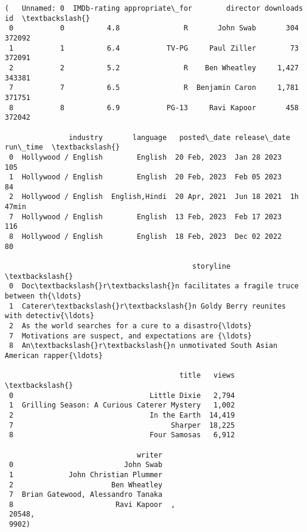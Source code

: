 \documentclass[11pt]{article}
\makeatletter
\newcommand{\boxspacing}{\kern\kvtcb@left@rule\kern\kvtcb@boxsep}
\newcommand{\prompt}[4]{
        {\ttfamily\llap{{\color{#2}[#3]:\hspace{3pt}#4}}\vspace{-\baselineskip}}
    }
\makeatother
\begin{document}
            \begin{tcolorbox}[breakable, size=fbox, boxrule=.5pt, pad at break*=1mm, opacityfill=0]
\prompt{Out}{outcolor}{48}{\boxspacing}
\begin{Verbatim}[commandchars=\\\{\}]
(   Unnamed: 0  IMDb-rating appropriate\_for        director downloads      id  \textbackslash{}
 0           0          4.8               R       John Swab       304  372092
 1           1          6.4           TV-PG     Paul Ziller        73  372091
 2           2          5.2               R    Ben Wheatley     1,427  343381
 7           7          6.5               R  Benjamin Caron     1,781  371751
 8           8          6.9           PG-13     Ravi Kapoor       458  372042

               industry       language   posted\_date release\_date  run\_time  \textbackslash{}
 0  Hollywood / English        English  20 Feb, 2023  Jan 28 2023       105
 1  Hollywood / English        English  20 Feb, 2023  Feb 05 2023        84
 2  Hollywood / English  English,Hindi  20 Apr, 2021  Jun 18 2021  1h 47min
 7  Hollywood / English        English  13 Feb, 2023  Feb 17 2023       116
 8  Hollywood / English        English  18 Feb, 2023  Dec 02 2022        80

                                            storyline  \textbackslash{}
 0  Doc\textbackslash{}r\textbackslash{}n facilitates a fragile truce between th{\ldots}
 1  Caterer\textbackslash{}r\textbackslash{}n Goldy Berry reunites with detectiv{\ldots}
 2  As the world searches for a cure to a disastro{\ldots}
 7  Motivations are suspect, and expectations are {\ldots}
 8  An\textbackslash{}r\textbackslash{}n unmotivated South Asian American rapper{\ldots}

                                         title   views  \textbackslash{}
 0                                Little Dixie   2,794
 1  Grilling Season: A Curious Caterer Mystery   1,002
 2                                In the Earth  14,419
 7                                     Sharper  18,225
 8                                Four Samosas   6,912

                               writer
 0                          John Swab
 1             John Christian Plummer
 2                       Ben Wheatley
 7  Brian Gatewood, Alessandro Tanaka
 8                        Ravi Kapoor  ,
 20548,
 9902)
\end{Verbatim}
\end{tcolorbox}
        
\end{document}
